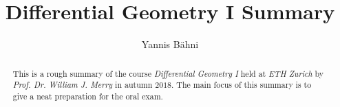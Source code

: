 

\setcounter{section}{1}

\title{Differential Geometry I Summary}
\author{Yannis B\"{a}hni}
\address[Yannis B\"{a}hni]{ETH Zurich, R\"{a}mistrasse 101, 8092 Zurich}



\begin{abstract}
	This is a rough summary of the course \emph{Differential Geometry I} held at \emph{ETH Zurich} by \emph{Prof. Dr. William J. Merry} in autumn $2018$. The main focus of this summary is to give a neat preparation for the oral exam.
\end{abstract}

\maketitle

\tableofcontents


